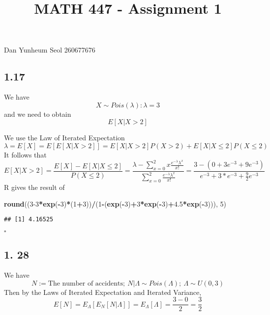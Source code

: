 \documentclass[]{article}
\title{MATH 447 - Assignment 1}
\author{}
\date{}
\newenvironment{Shaded}{\begin{snugshade}}{\end{snugshade}}
\newcommand{\DecValTok}[1]{\textcolor[rgb]{0.00,0.00,0.81}{#1}}
\newcommand{\FloatTok}[1]{\textcolor[rgb]{0.00,0.00,0.81}{#1}}
\newcommand{\KeywordTok}[1]{\textcolor[rgb]{0.13,0.29,0.53}{\textbf{#1}}}
\newcommand{\NormalTok}[1]{#1}
\newcommand{\OperatorTok}[1]{\textcolor[rgb]{0.81,0.36,0.00}{\textbf{#1}}}
\begin{document}
\maketitle

Dan Yunheum Seol 260677676

\hypertarget{section}{%
\subsection{1.17}\label{section}}

We have \[
X \sim Pois(\lambda) : \lambda = 3
\] and we need to obtain \[
E[X|X > 2]
\]

We use the Law of Iterated Expectation \[
\lambda = E[X] = E[E[X|X>2]] = E[X|X>2]P(X >2) + E[X| X \leq 2] P(X \leq 2)
\] It follows that \[
E[X|X>2] = \frac{E[X]-E[X|X \leq 2]}{P(X \leq 2)} = \frac{\lambda - \sum_{x=0}^2 x  \frac{e^{-\lambda} \lambda^x}{x!} }{\sum_{x=0}^2   \frac{e^{-\lambda} \lambda^x}{x!}} = \frac{3 - (0 + 3e^{-3} + 9e^{-3})}{e^{-3} + 3*e^{-3}+\frac{9}{2}e^{-3}}
\] R gives the result of

\begin{Shaded}
\begin{Highlighting}[]
\KeywordTok{round}\NormalTok{((}\DecValTok{3-3}\OperatorTok{*}\KeywordTok{exp}\NormalTok{(}\OperatorTok{-}\DecValTok{3}\NormalTok{)}\OperatorTok{*}\NormalTok{(}\DecValTok{1}\OperatorTok{+}\DecValTok{3}\NormalTok{))}\OperatorTok{/}\NormalTok{(}\DecValTok{1}\OperatorTok{-}\NormalTok{(}\KeywordTok{exp}\NormalTok{(}\OperatorTok{-}\DecValTok{3}\NormalTok{)}\OperatorTok{+}\DecValTok{3}\OperatorTok{*}\KeywordTok{exp}\NormalTok{(}\OperatorTok{-}\DecValTok{3}\NormalTok{)}\OperatorTok{+}\FloatTok{4.5}\OperatorTok{*}\KeywordTok{exp}\NormalTok{(}\OperatorTok{-}\DecValTok{3}\NormalTok{))), }\DecValTok{5}\NormalTok{)}
\end{Highlighting}
\end{Shaded}

\begin{verbatim}
## [1] 4.16525
\end{verbatim}

\(\square\)

\hypertarget{section-1}{%
\subsection{1. 28}\label{section-1}}

We have \[
N := \text{The number of accidents};\ N|\Lambda \sim Pois(\Lambda);\ \Lambda \sim U(0,3)
\] Then by the Laws of Iterated Expectation and Iterated Variance, \[
E[N] = E_{\Lambda}[E_{N}[N| \Lambda]] = E_{\Lambda}[\Lambda] = \frac{3-0}{2} = \frac{3}{2}
\]
\end{document}

